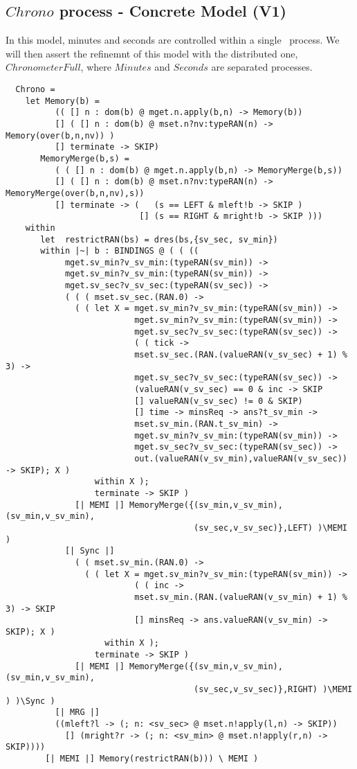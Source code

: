 \subsection{$Chrono$ process - Concrete Model (V1)}
In this model, minutes and seconds are controlled within a single \Circus\ process. We will then assert the refinemnt of this model with the distributed one, $ChronometerFull$, where $Minutes$ and $Seconds$ are separated processes.
\begin{verbatim}
  Chrono =
    let Memory(b) =
          (( [] n : dom(b) @ mget.n.apply(b,n) -> Memory(b))
          [] ( [] n : dom(b) @ mset.n?nv:typeRAN(n) -> Memory(over(b,n,nv)) )
          [] terminate -> SKIP)
       MemoryMerge(b,s) =
          ( ( [] n : dom(b) @ mget.n.apply(b,n) -> MemoryMerge(b,s))
          [] ( [] n : dom(b) @ mset.n?nv:typeRAN(n) -> MemoryMerge(over(b,n,nv),s))
          [] terminate -> (   (s == LEFT & mleft!b -> SKIP )
                           [] (s == RIGHT & mright!b -> SKIP )))
    within
       let  restrictRAN(bs) = dres(bs,{sv_sec, sv_min})
       within |~| b : BINDINGS @ ( ( ((
            mget.sv_min?v_sv_min:(typeRAN(sv_min)) ->
            mget.sv_min?v_sv_min:(typeRAN(sv_min)) ->
            mget.sv_sec?v_sv_sec:(typeRAN(sv_sec)) ->
            ( ( ( mset.sv_sec.(RAN.0) ->
              ( ( let X = mget.sv_min?v_sv_min:(typeRAN(sv_min)) ->
                          mget.sv_min?v_sv_min:(typeRAN(sv_min)) ->
                          mget.sv_sec?v_sv_sec:(typeRAN(sv_sec)) ->
                          ( ( tick ->
                          mset.sv_sec.(RAN.(valueRAN(v_sv_sec) + 1) % 3) ->
                          mget.sv_sec?v_sv_sec:(typeRAN(sv_sec)) ->
                          (valueRAN(v_sv_sec) == 0 & inc -> SKIP
                          [] valueRAN(v_sv_sec) != 0 & SKIP)
                          [] time -> minsReq -> ans?t_sv_min ->
                          mset.sv_min.(RAN.t_sv_min) ->
                          mget.sv_min?v_sv_min:(typeRAN(sv_min)) ->
                          mget.sv_sec?v_sv_sec:(typeRAN(sv_sec)) ->
                          out.(valueRAN(v_sv_min),valueRAN(v_sv_sec)) -> SKIP); X )
                  within X );
                  terminate -> SKIP )
              [| MEMI |] MemoryMerge({(sv_min,v_sv_min),(sv_min,v_sv_min),
                                      (sv_sec,v_sv_sec)},LEFT) )\MEMI )
            [| Sync |]
              ( ( mset.sv_min.(RAN.0) ->
                ( ( let X = mget.sv_min?v_sv_min:(typeRAN(sv_min)) ->
                          ( ( inc ->
                          mset.sv_min.(RAN.(valueRAN(v_sv_min) + 1) % 3) -> SKIP
                          [] minsReq -> ans.valueRAN(v_sv_min) -> SKIP); X )
                    within X );
                  terminate -> SKIP )
              [| MEMI |] MemoryMerge({(sv_min,v_sv_min),(sv_min,v_sv_min),
                                      (sv_sec,v_sv_sec)},RIGHT) )\MEMI ) )\Sync )
          [| MRG |]
          ((mleft?l -> (; n: <sv_sec> @ mset.n!apply(l,n) -> SKIP))
            [] (mright?r -> (; n: <sv_min> @ mset.n!apply(r,n) -> SKIP))))
        [| MEMI |] Memory(restrictRAN(b))) \ MEMI )
\end{verbatim}
\pagebreak

